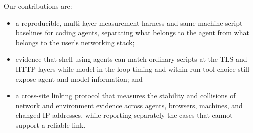 Our contributions are:
\begin{itemize}
  \item a reproducible, multi-layer measurement harness and same-machine script baselines for coding
  agents, separating what belongs to the agent from what belongs to the user's networking stack;
  \item evidence that shell-using agents can match ordinary scripts at the TLS and HTTP layers while
  model-in-the-loop timing and within-run tool choice still expose agent and model information; and
  \item a cross-site linking protocol that measures the stability and collisions of network and
  environment evidence across agents, browsers, machines, and changed IP addresses, while reporting
  separately the cases that cannot support a reliable link.
\end{itemize}

